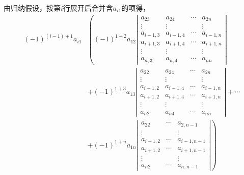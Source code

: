 \begin{frame}    
    由归纳假设，按第$i$行展开后合并含$a_{i1}$的项得，
    $$
    \begin{aligned}
      (-1)^{(i-1)+1}a_{i1}  & \left (  (-1)^{1+2} a_{12}  \left|
          \begin{array}{cccc}
            a_{23}  & a_{24}  & \cdots & a_{2n}\\
            \vdots & \vdots & & \vdots \\
            a_{i-1,3}  & a_{i-1,4}  & \cdots & a_{i-1,n}\\
            a_{i+1,3}  & a_{i+1,4}  & \cdots & a_{i+1,n}\\
            \vdots & \vdots & & \vdots \\
            a_{n,3}  & a_{n,4}  & \cdots & a_{nn}
          \end{array}
        \right| \right. \\
        & + (-1)^{1+3} a_{13}   \left|
          \begin{array}{cccc}
            a_{22} & a_{24}  & \cdots & a_{2n}\\
            \vdots & \vdots & & \vdots \\
            a_{i-1,2} & a_{i-1,4}  & \cdots & a_{i-1,n}\\
            a_{i+1,2} & a_{i+1,4}  & \cdots & a_{i+1,n}\\
            \vdots & \vdots & & \vdots \\
            a_{n2}  & a_{n4} & \cdots & a_{nn}
          \end{array}
        \right|+ \cdots
       \\
      & \left.   +  (-1)^{1+n} a_{1n}  \left|
          \begin{array}{ccc}
            a_{22}   & \cdots & a_{2,n-1}\\
            \vdots & & \vdots \\
            a_{i-1,2}   & \cdots & a_{i-1,n-1}\\
            a_{i+1,2}   & \cdots & a_{i+1,n-1}\\
            \vdots  & & \vdots \\
            a_{n2}   & \cdots & a_{n,n-1}
          \end{array}
        \right| \right) 
    \end{aligned}
    $$
\end{frame}

